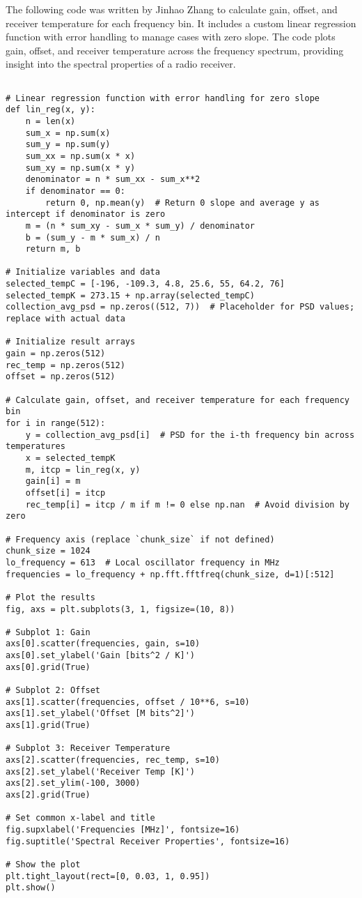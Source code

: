 \documentclass[10pt, preprint]{aastex}
\begin{document}
The following code was written by Jinhao Zhang to calculate gain, offset, and receiver temperature for each frequency bin. It includes a custom linear regression function with error handling to manage cases with zero slope. The code plots gain, offset, and receiver temperature across the frequency spectrum, providing insight into the spectral properties of a radio receiver.
\begin{verbatim}

# Linear regression function with error handling for zero slope
def lin_reg(x, y):
    n = len(x)
    sum_x = np.sum(x)
    sum_y = np.sum(y)
    sum_xx = np.sum(x * x)
    sum_xy = np.sum(x * y)
    denominator = n * sum_xx - sum_x**2
    if denominator == 0:
        return 0, np.mean(y)  # Return 0 slope and average y as intercept if denominator is zero
    m = (n * sum_xy - sum_x * sum_y) / denominator
    b = (sum_y - m * sum_x) / n
    return m, b

# Initialize variables and data
selected_tempC = [-196, -109.3, 4.8, 25.6, 55, 64.2, 76]
selected_tempK = 273.15 + np.array(selected_tempC)
collection_avg_psd = np.zeros((512, 7))  # Placeholder for PSD values; replace with actual data

# Initialize result arrays
gain = np.zeros(512)
rec_temp = np.zeros(512)
offset = np.zeros(512)

# Calculate gain, offset, and receiver temperature for each frequency bin
for i in range(512):
    y = collection_avg_psd[i]  # PSD for the i-th frequency bin across temperatures
    x = selected_tempK
    m, itcp = lin_reg(x, y)
    gain[i] = m
    offset[i] = itcp
    rec_temp[i] = itcp / m if m != 0 else np.nan  # Avoid division by zero

# Frequency axis (replace `chunk_size` if not defined)
chunk_size = 1024
lo_frequency = 613  # Local oscillator frequency in MHz
frequencies = lo_frequency + np.fft.fftfreq(chunk_size, d=1)[:512]

# Plot the results
fig, axs = plt.subplots(3, 1, figsize=(10, 8))

# Subplot 1: Gain
axs[0].scatter(frequencies, gain, s=10)
axs[0].set_ylabel('Gain [bits^2 / K]')
axs[0].grid(True)

# Subplot 2: Offset
axs[1].scatter(frequencies, offset / 10**6, s=10)
axs[1].set_ylabel('Offset [M bits^2]')
axs[1].grid(True)

# Subplot 3: Receiver Temperature
axs[2].scatter(frequencies, rec_temp, s=10)
axs[2].set_ylabel('Receiver Temp [K]')
axs[2].set_ylim(-100, 3000)
axs[2].grid(True)

# Set common x-label and title
fig.supxlabel('Frequencies [MHz]', fontsize=16)
fig.suptitle('Spectral Receiver Properties', fontsize=16)

# Show the plot
plt.tight_layout(rect=[0, 0.03, 1, 0.95])
plt.show()
\end{verbatim}
\end{document}
